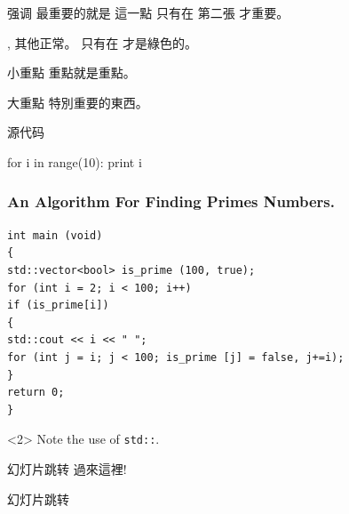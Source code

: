 \documentclass[no-math, xcolor=table]{beamer} %
\begin{document}
\begin{frame}{强调}
	最重要的就是 \alert{這一點}
	只有在 \alert<2>{第二張} 才重要。

	{\color{green}{綠色的文字}}, 其他正常。
	只有在 {} 才是綠色的。

	\begin{block}{小重點} 
		重點就是重點。 
	\end{block}

	\begin{alertblock}{大重點} 
		特別重要的東西。 
	\end{alertblock}
\end{frame}

\begin{frame}{源代码}


	\begin{semiverbatim} 
		for \alert{i} in range(10):
		print \alert{i}
	\end{semiverbatim}

\end{frame}

\begin{frame}[fragile]
\frametitle{An Algorithm For Finding Primes Numbers.}
\begin{verbatim}
int main (void)
{
std::vector<bool> is_prime (100, true);
for (int i = 2; i < 100; i++)
if (is_prime[i])
{
std::cout << i << " ";
for (int j = i; j < 100; is_prime [j] = false, j+=i);
}
return 0;
}
\end{verbatim}

\begin{uncoverenv}<2> 
	Note the use of \verb|std::|. 
\end{uncoverenv}

\end{frame}


\begin{frame}[label=here]{幻灯片跳转}
	過來這裡!
\end{frame}

\begin{frame}{幻灯片跳转}
	\hyperlink{here}{}
\end{frame}
\end{document}
